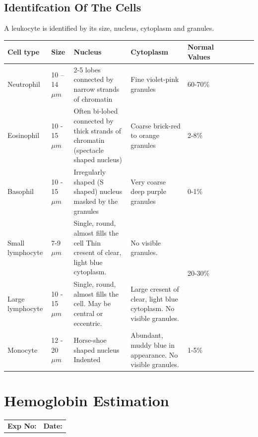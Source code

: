 \documentclass[a4paper,12pt]{book}
\begin{document}
					\section*{Identifcation Of The Cells}
					A leukocyte is identified by its size, nucleus, cytoplasm and granules.
					\begin{tabularx}{\textwidth}{|*{5}{m{.2\textwidth}|X|}}
						\hline
						\textbf{Cell type}&
						\textbf{Size}&
						\textbf{Nucleus}&
						\textbf{Cytoplasm}&
						\textbf{Normal Values}\\

						\hline

						Neutrophil&
						10 – 14 ${\mu}m$&
						2-5 lobes connected by narrow strands of chromatin&
						Fine violet-pink granules&
						60-70\%\\

						\hline
						Eosinophil&
						10 - 15 ${\mu}m$&
						Often bi-lobed connected by thick strands of chromatin (spectacle shaped nucleus)&
						Coarse brick-red to orange granules&
						2-8\%\\
						\hline	

						Basophil&
						10 - 15 ${\mu}m$&
						Irregularly shaped (S shaped) nucleus masked by the granules&
						Very coarse deep purple granules&
						0-1\%\\
						\hline

						Small lymphocyte&
						7-9 ${\mu}m$&
						Single, round, almost fills the cell Thin cresent of clear, light blue cytoplasm. &
						No visible granules.&
						\multirow{2}{*}{20-30\%}\\
						\cline{1-4}

						Large lymphocyte&
						10 - 15 ${\mu}m$&
						Single, round, almost fills the cell.  May be central or eccentric.&
						Large cresent of clear, light blue cytoplasm. No visible granules.&
						\\
						\hline

						Monocyte&
						12 - 20 ${\mu}m$&
						Horse-shoe shaped nucleus Indented&
						Abundant, muddy blue in appearance. No visible granules.&
						1-5\%\\
						\hline
					\end{tabularx}	





					\chapter*{\centering Hemoglobin Estimation}
					\begin{tabular}{p{5in} p{1in}}
						\textbf{Exp No:}  & \textbf{Date:}\\
					\end{tabular}
\end{document}

